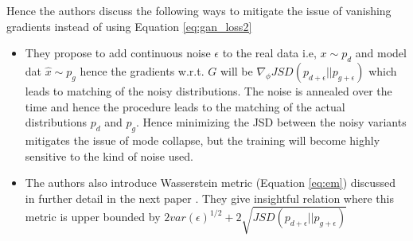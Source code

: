 Hence the authors discuss the following ways to mitigate the issue of vanishing gradients instead of using Equation \ref{eq:gan_loss2}
\begin{itemize}
    \item They propose to add continuous noise $\epsilon$ to the real data i.e, $x \sim p_d$ and model dat $\hat{x} \sim p_g$ hence the gradients w.r.t. $G$ will be $\nabla_{\phi} JSD(p_{d+\epsilon} || p_{g + \epsilon})$ which leads to matching of the noisy distributions. The noise is annealed over the time and hence the procedure leads to the matching of the actual distributions $p_d$ and $p_g$. Hence minimizing the JSD between the noisy variants mitigates the issue of mode collapse, but the training will become highly sensitive to the kind of noise used.
    \item The authors also introduce Wasserstein metric (Equation \ref{eq:em}) discussed in further detail in the next paper \cite{arjovskyWGAN}. They give insightful relation where this metric is upper bounded by $2 var(\epsilon)^{1/2} + 2\sqrt{ JSD(p_{d+\epsilon} || p_{g+\epsilon})}$
\end{itemize}{}



